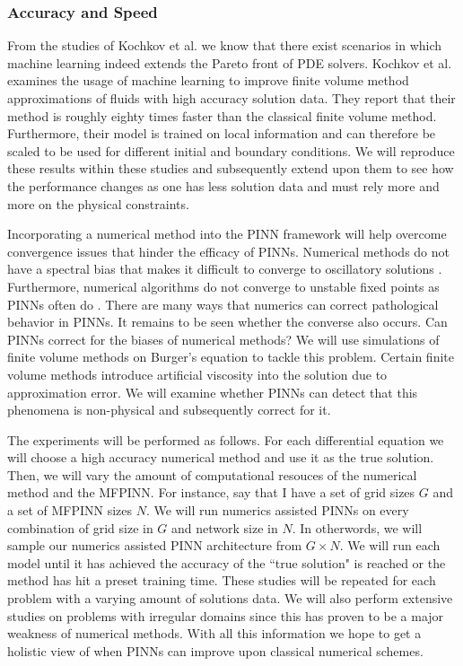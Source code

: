 \documentclass[12pt]{article}
\begin{document}
\subsubsection*{Accuracy and Speed}

From the studies of Kochkov et al. \cite{fluidml} we know that there exist scenarios in which machine learning
indeed extends the Pareto front of PDE solvers. Kochkov et al. \cite{fluidml} examines the usage of machine learning 
to improve finite volume method approximations of fluids with high accuracy solution data. 
They report that their method is roughly eighty times faster than the classical finite volume method.
Furthermore, their model is trained on local information and can therefore be scaled to be used for different initial and boundary conditions.
We will reproduce these results within these studies and subsequently extend upon them to see how the performance changes as one has less solution data
and must rely more and more on the physical constraints.

Incorporating a numerical method into the PINN framework will help overcome convergence issues that hinder the efficacy of PINNs.
Numerical methods do not have a spectral bias that makes it difficult to converge to oscillatory solutions \cite{bias}. Furthermore,
numerical algorithms do not converge to unstable fixed points as PINNs often do \cite{fixedpts}. There are many ways that numerics can 
correct pathological behavior in PINNs. It remains to be seen whether the converse also occurs. Can PINNs correct for the
biases of numerical methods? We will use simulations of finite volume methods on Burger's equation to tackle this problem. Certain finite
volume methods introduce artificial viscosity into the solution due to approximation error. We will examine whether
PINNs can detect that this phenomena is non-physical and subsequently correct for it.

The experiments will be performed as follows. For each differential equation we will choose a high accuracy numerical method and use it
as the true solution. Then, we will vary the amount of computational resouces of the numerical method and the MFPINN. For instance, say
that I have a set of grid sizes $G$ and a set of MFPINN sizes $N$. We will run numerics assisted PINNs on every combination of grid size in $G$ 
and network size in $N$. In otherwords, we will sample our numerics assisted PINN architecture from $G \times N$. We will run each model until it
has achieved the accuracy of the ``true solution" is reached or the method has hit a preset training time. These studies will be repeated for each
problem with a varying amount of solutions data. We will also perform extensive studies on problems with irregular domains since this 
has proven to be a major weakness of numerical methods. With all this information we hope to get a holistic view of when PINNs can improve upon classical
numerical schemes.
\end{document}
